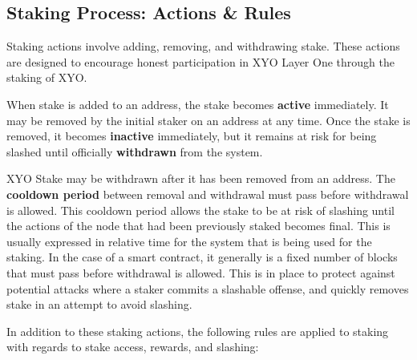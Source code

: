 \documentclass{article}
\begin{document}
\subsection{Staking Process: Actions \& Rules}
Staking actions involve adding, removing, and withdrawing stake. These actions are designed to encourage honest participation in XYO Layer One through the staking of XYO. 

When stake is added to an address, the stake becomes \textbf{active} immediately. It may be removed by the initial staker on an address at any time. Once the stake is removed, it becomes \textbf{inactive} immediately, but it remains at risk for being slashed until officially \textbf{withdrawn} from the system. 

XYO Stake may be withdrawn after it has been removed from an address. The \textbf{cooldown period} between removal and withdrawal must pass before withdrawal is allowed. This cooldown period allows the stake to be at risk of slashing until the actions of the node that had been previously staked becomes final. This is usually expressed in relative time for the system that is being used for the staking. In the case of a smart contract, it generally is a fixed number of blocks that must pass before withdrawal is allowed. This is in place to protect against potential attacks where a staker commits a slashable offense, and quickly removes stake in an attempt to avoid slashing.

In addition to these staking actions, the following rules are applied to staking with regards to stake access, rewards, and slashing:
\end{document}
